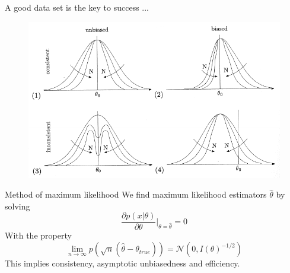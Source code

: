 \documentclass[
aspectratio=169,
14pt,
professionalfonts
]{beamer}
\begin{document}
\begin{frame}{A good data set is the key to success ...}
    \begin{figure}
    \centering
    \includegraphics[width=0.8\linewidth]{../plots/estimator.pdf}
\end{figure}
\end{frame}

\begin{frame}{Method of maximum likelihood}
    \vspace{-0.2cm}
    We find maximum likelihood estimators $ \hat \theta$ by solving
    $$
    \frac{\partial p(x|\theta)}{\partial \theta}\bigg\vert_{\theta = \hat \theta} = 0
    $$
    With the property
    $$
    \lim_{n \to \infty} p\left(\sqrt{n}(\hat \theta - \theta_{true})\right) = \mathcal{N}\left(0, I(\theta)^{-1/2}\right)
    $$
    This implies consistency, asymptotic unbiasedness and efficiency.
\end{frame}

\end{document}
